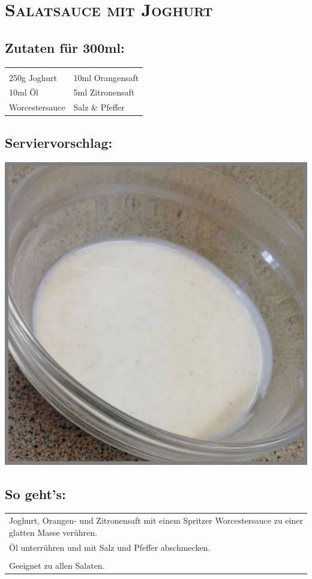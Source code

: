 \section{\textsc{Salatsauce mit Joghurt}}

\subsection*{Zutaten für 300ml:}

\begin{tabular}{p{7.5cm} p{7.5cm}}
	& \\
	250g Joghurt & 10ml Orangensaft \\
	10ml Öl & 5ml Zitronensaft \\
	Worcestersauce & Salz \& Pfeffer
\end{tabular}

\subsection*{Serviervorschlag:}

\includegraphics[width=\textwidth]{img/d_joghurt.jpeg} \cite{djoghurt}

\subsection*{So geht's:}

\begin{tabular}{p{15cm}}
	\\
	Joghurt, Orangen- und Zitronensaft mit einem Spritzer Worcestersauce zu einer glatten Masse verühren.\\
	Öl unterrühren und mit Salz und Pfeffer abschmecken.\\
	\\
	Geeignet zu allen Salaten.
\end{tabular}

